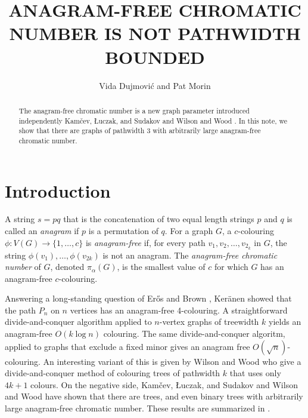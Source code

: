 \documentclass{patmorin}
\title{\MakeUppercase{Anagram-Free Chromatic Number is not Pathwidth Bounded}}
\author{Vida Dujmović and Pat Morin}%
\begin{document}
\maketitle
%
\begin{abstract}
  The anagram-free chromatic number is a new graph parameter introduced
  independently Kamčev, Łuczak, and Sudakov \cite{kamcev.luczak.ea:anagram-free}
  and Wilson and Wood \cite{wilson.wood:anagram-free}.  In this note, we show
  that there are graphs of pathwidth 3 with arbitrarily large anagram-free
  chromatic number.
\end{abstract}
%
%


\section{Introduction}

A string $s=pq$ that is the concatenation of two equal length strings
 $p$ and $q$ is called an \emph{anagram} if $p$ is a permutation of $q$.
For a graph $G$, a $c$-colouring $\phi:V(G)\to\{1,\ldots,c\}$ is
\emph{anagram-free} if, for every path $v_1,v_2,\ldots,v_{2_k}$ in
$G$, the string $\phi(v_1),\ldots,\phi(v_{2k})$ is not an anagram.  The
\emph{anagram-free chromatic number} of $G$, denoted $\pi_\alpha(G)$, is
the smallest value of $c$ for which $G$ has an anagram-free $c$-colouring.

Answering a long-standing question of Er\H{o}s and Brown \cite{X},
Ker\"anen showed that the path $P_n$ on $n$ vertices has an anagram-free
4-colouring.  A straightforward divide-and-conquer algorithm applied to
$n$-vertex graphs of treewidth $k$ yields an anagram-free $O(k\log n)$
colouring.  The same divide-and-conquer algoritm, applied to graphs that
exclude a fixed minor gives an anagram free $O(\sqrt{n})$-colouring.
An interesting variant of this is given by Wilson and Wood \cite{X}
who give a divide-and-conquer method of colouring trees of pathwidth $k$
that uses only $4k+1$ colours.  On the negative side, Kamčev, Łuczak,
and Sudakov \cite{kamcev.luczak.ea:anagram-free} and Wilson and Wood
\cite{wilson.wood:anagram-free} have shown that there are trees, and
even binary trees with arbitrarily large anagram-free chromatic number.
These results are summarized in .
\end{document}
